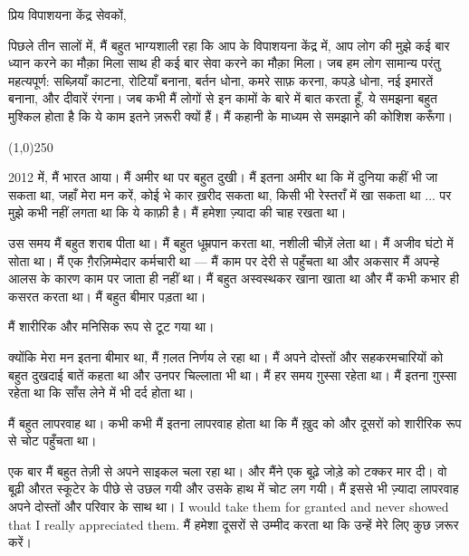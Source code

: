\documentclass{article}
\begin{document}
प्रिय विपाशयना केंद्र सेवकों,

पिछले तीन सालों में, मैं बहुत भाग्यशाली रहा कि आप के विपाशयना केंद्र में, आप लोग की मुझे कई बार ध्यान करने का मौक़ा मिला साथ
ही कई बार सेवा करने का मौक़ा मिला। जब हम लोग सामान्य परंतु महत्यपूर्ण: सब्ज़ियाँ काटना, रोटियाँ
बनाना, बर्तन धोना, कमरे साफ़ करना, कपड़े धोना, नई इमारतें बनाना, और दीवारें रंगना। जब कभी मैं
लोगों से इन कामों के बारे में बात करता हूँ, ये समझना बहुत मुश्किल होता है कि ये काम इतने ज़रूरी क्यों हैं।
मैं कहानी के माध्यम से समझाने की कोशिश करूँगा।


\begin{center}
\line(1,0){250}
\end{center}

2012 में, मैं भारत आया। मैं अमीर था पर बहुत दुखी। मैं इतना अमीर था कि में दुनिया कहीं भी जा सकता
था, जहाँ मेरा मन करें, कोई भे कार ख़रीद सकता था, किसी भी रेस्तराँ में खा सकता था ... पर मुझे कभी
नहीं लगता था कि ये काफ़ी है। मैं हमेशा ज़्यादा की चाह रखता था।

उस समय मैं बहुत शराब पीता था। मैं बहुत धूम्रपान करता था, नशीली चीज़ें लेता था। मैं अजीव घंटो में सोता
था। मैं एक ग़ैरज़िम्मेदार कर्मचारी था --- मैं काम पर देरी से पहुँचता था और अकसार मैं अपन्हे आलस के कारण
काम पर जाता ही नहीं था। मैं बहुत अस्वस्थकर खाना खाता था और मैं कभी कभार ही कसरत करता था। मैं
बहुत बीमार पड़ता था।

मैं शारीरिक और मनिसिक रूप से टूट गया था।

क्योंकि मेरा मन इतना बीमार था, मैं ग़लत निर्णय ले रहा था। मैं अपने दोस्तों और सहकरमचारियों को बहुत
दुखदाई बातें कहता था और उनपर चिल्लाता भी था। मैं हर समय ग़ुस्सा रहेता था। मैं इतना ग़ुस्सा रहेता था
कि साँस लेने में भी दर्द होता था।

मैं बहुत लापरवाह था। कभी कभी मैं इतना लापरवाह होता था कि मैं ख़ुद को और दूसरों को शारीरिक रूप से
चोट पहुँचता था।

एक बार मैं बहुत तेज़ी से अपने साइकल चला रहा था। और मैंने एक बूढ़े जोड़े को टक्कर मार दी। वो बूढ़ी औरत
स्कूटेर के पीछे से उछल गयी और उसके हाथ में चोट लग गयी। मैं इससे भी ज़्यादा लापरवाह अपने दोस्तों और
परिवार के साथ था। I would take them for granted and never showed that I really
appreciated them. मैं हमेशा दूसरों से उम्मीद करता था कि उन्हें मेरे लिए कुछ ज़रूर करें।
\end{document}
